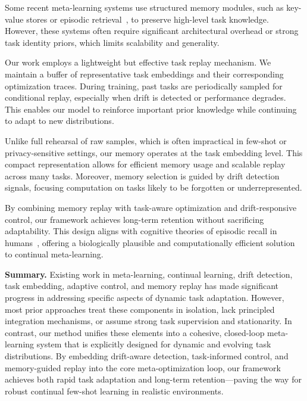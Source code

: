 \documentclass[conference]{IEEEtran}
\begin{document}
Some recent meta-learning systems use structured memory modules, such as key-value stores or episodic retrieval~\cite{santoro2016meta, ravi2017episodic}, to preserve high-level task knowledge. However, these systems often require significant architectural overhead or strong task identity priors, which limits scalability and generality.

Our work employs a lightweight but effective task replay mechanism. We maintain a buffer of representative task embeddings and their corresponding optimization traces. During training, past tasks are periodically sampled for conditional replay, especially when drift is detected or performance degrades. This enables our model to reinforce important prior knowledge while continuing to adapt to new distributions.

Unlike full rehearsal of raw samples, which is often impractical in few-shot or privacy-sensitive settings, our memory operates at the task embedding level. This compact representation allows for efficient memory usage and scalable replay across many tasks. Moreover, memory selection is guided by drift detection signals, focusing computation on tasks likely to be forgotten or underrepresented.

By combining memory replay with task-aware optimization and drift-responsive control, our framework achieves long-term retention without sacrificing adaptability. This design aligns with cognitive theories of episodic recall in humans~\cite{marblestone2016towards}, offering a biologically plausible and computationally efficient solution to continual meta-learning.

\vspace{0.5em}
\noindent\textbf{Summary.} Existing work in meta-learning, continual learning, drift detection, task embedding, adaptive control, and memory replay has made significant progress in addressing specific aspects of dynamic task adaptation. However, most prior approaches treat these components in isolation, lack principled integration mechanisms, or assume strong task supervision and stationarity. In contrast, our method unifies these elements into a cohesive, closed-loop meta-learning system that is explicitly designed for dynamic and evolving task distributions. By embedding drift-aware detection, task-informed control, and memory-guided replay into the core meta-optimization loop, our framework achieves both rapid task adaptation and long-term retention—paving the way for robust continual few-shot learning in realistic environments.
\end{document}
